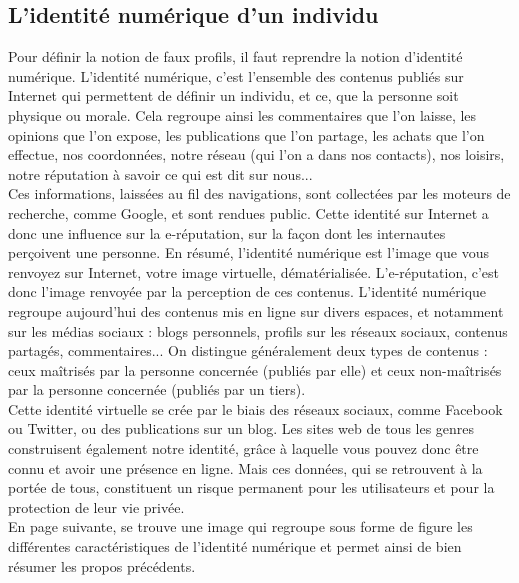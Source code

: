 \documentclass[12pt]{report}
\begin{document}
\subsection{L'identité numérique d'un individu}
Pour définir la notion de faux profils, il faut reprendre la notion d'identité numérique. L'identité numérique, c'est l'ensemble des contenus publiés sur Internet qui permettent de définir un individu, et ce, que la personne soit physique ou morale. Cela regroupe ainsi les commentaires que l'on laisse, les opinions que l'on expose, les publications que l'on partage, les achats que l'on effectue, nos coordonnées, notre réseau (qui l'on a dans nos contacts), nos loisirs, notre réputation à savoir ce qui est dit sur nous... \\

Ces informations, laissées au fil des navigations, sont collectées par les moteurs de recherche, comme Google, et sont rendues public.
Cette identité sur Internet a donc une influence sur la e-réputation, sur la façon dont les internautes perçoivent une personne. En résumé, l’identité numérique est l’image que vous renvoyez sur Internet, votre image virtuelle, dématérialisée.
L'e-réputation, c'est donc l'image renvoyée par la perception de ces contenus. L'identité numérique regroupe aujourd'hui des contenus mis en ligne sur divers espaces, et notamment sur les médias sociaux : blogs personnels, profils sur les réseaux sociaux, contenus partagés, commentaires... On distingue généralement deux types de contenus : ceux maîtrisés par la personne concernée (publiés par elle) et ceux non-maîtrisés par la personne concernée (publiés par un tiers). \\

Cette identité virtuelle se crée par le biais des réseaux sociaux, comme Facebook ou Twitter, ou des publications sur un blog. Les sites web de tous les genres construisent également notre identité, grâce à laquelle vous pouvez donc être connu et avoir une présence en ligne. Mais ces données, qui se retrouvent à la portée de tous, constituent un risque permanent pour les utilisateurs et pour la protection de leur vie privée. \\

En page suivante, se trouve une image qui regroupe sous forme de figure les différentes caractéristiques de l'identité numérique et permet ainsi de bien résumer les propos précédents. 
\end{document}
